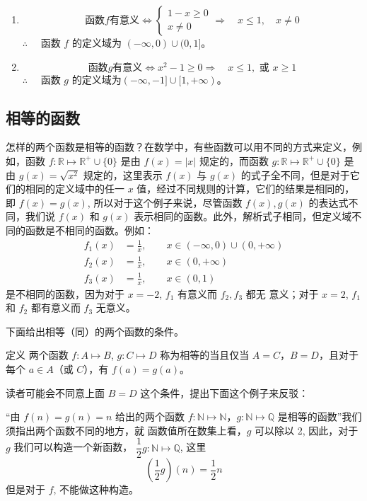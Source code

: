 \begin{solution}
    \begin{enumerate}
        \item \[\text{函数$f$有意义}\Leftrightarrow \begin{cases}
    1-x \geqslant 0\\
    x\ne 0
\end{cases}\Rightarrow\quad x\leqslant 1, \quad x\ne 0\]
$\therefore\quad $ 函数 $f$ 的定义域为 $(-\infty,0)\cup(0,1]$。

\item \[\text{函数$g$有意义}\Leftrightarrow x^2-1\geqslant 0 \Rightarrow\quad x\leqslant 1, \text{ 或 } x\geqslant 1\]
$\therefore\quad $ 函数 $g$ 的定义域为$(-\infty,-1]\cup[1,+\infty)$。
    \end{enumerate}
\end{solution}

\subsection{相等的函数}
怎样的两个函数是相等的函数？在数学中，有些函数可以用不同的方式来定义，例如，函数 $f:\mathbb{R}\mapsto \mathbb{R}^+\cup\{0\}$ 是由 $f(x)=|x|$ 规定的，而函数 $g:\mathbb{R}\mapsto \mathbb{R}^+\cup\{0\}$ 是由 $g(x)=\sqrt{x^2}$ 规定的，这里表示 $f(x)$ 与 $g(x)$ 的式子全不同，但是对于它们的相同的定义域中的任一 $x$ 值，经过不同规则的计算，它们的结果是相同的，即 $f(x)=g(x)$, 所以对于这个例子来说，尽管函数 $f(x),g(x)$ 的表达式不同，我们说 $f(x)$ 和 $g(x)$ 表示相同的函数。此外，解析式子相同，但定义域不同的函数是不相同的函数。例如：
\[\begin{split}
    f_1(x)&=\frac{1}{x},\qquad x\in (-\infty,0)\cup(0,+\infty)\\
    f_2(x)&=\frac{1}{x},\qquad x\in (0,+\infty)\\
    f_3(x)&=\frac{1}{x},\qquad x\in (0,1)
\end{split}\]
是不相同的函数，因为对于 $x=-2$, $f_1$ 有意义而 $f_2,f_3$ 都无
意义；对于 $x=2$, $f_1$ 和 $f_2$ 都有意义而 $f_3$ 无意义。

下面给出相等（同）的两个函数的条件。
\begin{Definition}{定义}
两个函数 $f:A\mapsto B$, $g:C\mapsto D$ 称为相等的当且仅当 $A=C$，$B=D$，且对于每个 $a\in  A$（或 $C$），有 $f(a)=g(a)$。
\end{Definition}

读者可能会不同意上面 $B=D$ 这个条件，提出下面这个例子来反驳：

“由 $f(n)=g(n)=n$ 给出的两个函数 $f:\mathbb{N}\mapsto\mathbb{N}$，$g: \mathbb{N}\mapsto \mathbb{Q}$ 是相等的函数”我们须指出两个函数不同的地方，就
函数值所在数集上看，$g$ 可以除以 2, 因此，对于 $g$ 我们可以构造一个新函数，
$\dfrac{1}{2}g:\mathbb{N}\mapsto \mathbb{Q}$, 这里
\[\left(\frac{1}{2}g\right)(n)=\frac{1}{2}n\]
但是对于 $f$, 不能做这种构造。

